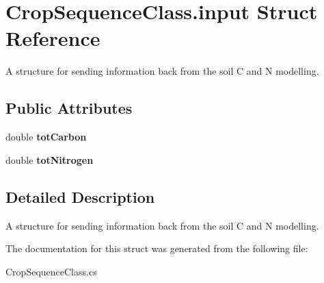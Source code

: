 \hypertarget{struct_crop_sequence_class_1_1input}{}\section{Crop\+Sequence\+Class.\+input Struct Reference}
\label{struct_crop_sequence_class_1_1input}


A structure for sending information back from the soil C and N modelling.  


\subsection*{Public Attributes}
\begin{DoxyCompactItemize}
\item 
\mbox{\label{struct_crop_sequence_class_1_1input_a9206773ea0414c13381f0d11d1e5badf}} 
double {\bfseries tot\+Carbon}
\item 
\mbox{\label{struct_crop_sequence_class_1_1input_ac0e76b502a9dc545d77580fe2de3b842}} 
double {\bfseries tot\+Nitrogen}
\end{DoxyCompactItemize}


\subsection{Detailed Description}
A structure for sending information back from the soil C and N modelling. 

The documentation for this struct was generated from the following file\+:\begin{DoxyCompactItemize}
\item 
Crop\+Sequence\+Class.\+cs\end{DoxyCompactItemize}

